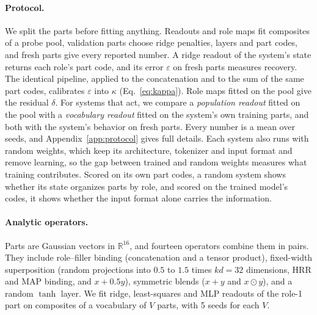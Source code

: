 \documentclass[10pt]{article}
\theoremstyle{plain}
\theoremstyle{remark}
\newcommand{\R}{\mathbb{R}}
\begin{document}
\paragraph{Protocol.} We split the parts before fitting anything. Readouts and role maps fit composites of a probe pool, validation parts choose ridge penalties, layers and part codes, and fresh parts give every reported number. A ridge readout of the system's state returns each role's part code, and its error $\varepsilon$ on fresh parts measures recovery. The identical pipeline, applied to the concatenation and to the sum of the same part codes, calibrates $\varepsilon$ into $\kappa$ (Eq.~\ref{eq:kappa}). Role maps fitted on the pool give the residual $\delta$. For systems that act, we compare a \emph{population readout} fitted on the pool with a \emph{vocabulary readout} fitted on the system's own training parts, and both with the system's behavior on fresh parts. Every number is a mean over seeds, and Appendix~\ref{app:protocol} gives full details. Each system also runs with random weights, which keep its architecture, tokenizer and input format and remove learning, so the gap between trained and random weights measures what training contributes. Scored on its own part codes, a random system shows whether its state organizes parts by role, and scored on the trained model's codes, it shows whether the input format alone carries the information.

\paragraph{Analytic operators.} Parts are Gaussian vectors in $\R^{16}$, and fourteen operators combine them in pairs. They include role--filler binding (concatenation and a tensor product), fixed-width superposition (random projections into $0.5$ to $1.5$ times $kd = 32$ dimensions, HRR and MAP binding, and $x + 0.5y$), symmetric blends ($x + y$ and $x \odot y$), and a random $\tanh$ layer. We fit ridge, least-squares and MLP readouts of the role-1 part on composites of a vocabulary of $V$ parts, with 5 seeds for each $V$.
\end{document}
